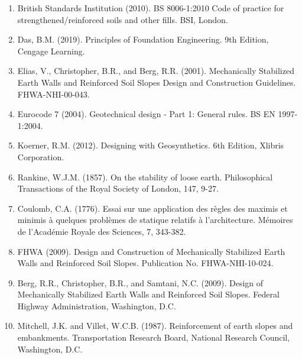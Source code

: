 \documentclass[10pt,a4paper,twocolumn]{article}
\begin{document}
\begin{enumerate}
\item British Standards Institution (2010). BS 8006-1:2010 Code of practice for strengthened/reinforced soils and other fills. BSI, London.

\item Das, B.M. (2019). Principles of Foundation Engineering. 9th Edition, Cengage Learning.

\item Elias, V., Christopher, B.R., and Berg, R.R. (2001). Mechanically Stabilized Earth Walls and Reinforced Soil Slopes Design and Construction Guidelines. FHWA-NHI-00-043.

\item Eurocode 7 (2004). Geotechnical design - Part 1: General rules. BS EN 1997-1:2004.

\item Koerner, R.M. (2012). Designing with Geosynthetics. 6th Edition, Xlibris Corporation.

\item Rankine, W.J.M. (1857). On the stability of loose earth. Philosophical Transactions of the Royal Society of London, 147, 9-27.

\item Coulomb, C.A. (1776). Essai sur une application des règles des maximis et minimis à quelques problèmes de statique relatifs à l'architecture. Mémoires de l'Académie Royale des Sciences, 7, 343-382.

\item FHWA (2009). Design and Construction of Mechanically Stabilized Earth Walls and Reinforced Soil Slopes. Publication No. FHWA-NHI-10-024.

\item Berg, R.R., Christopher, B.R., and Samtani, N.C. (2009). Design of Mechanically Stabilized Earth Walls and Reinforced Soil Slopes. Federal Highway Administration, Washington, D.C.

\item Mitchell, J.K. and Villet, W.C.B. (1987). Reinforcement of earth slopes and embankments. Transportation Research Board, National Research Council, Washington, D.C.
\end{enumerate}
\end{document}
